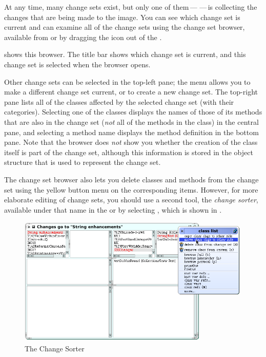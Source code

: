\documentclass[a4paper,10pt,twoside]{book}
\begin{document}
At any time, many change sets exist, but only one of them\,---\,\,---\,is collecting the changes that are being made to the image.  
You can see which change set is current and can examine all of the change sets using the  change set browser, available from  or by dragging the  icon out of the \toolsflapind.

 shows this browser.  The title bar shows which change set is current, and this change set is selected when the  browser opens. 

Other change sets can be selected in the top-left pane; the  menu allows you to make a different change set current, or to create a new change set.
The top-right pane lists all of the classes affected by the selected change set (with their categories).
Selecting one of the classes displays the names of those of its methods that are also in the change set (\emph{not} all of the methods in the class) in the central pane, and selecting a method name displays the method definition in the bottom pane.
Note that the browser does \emph{not} show you whether the creation of the class itself is part of the change set, although this information is stored in the object structure that is used to represent the change set.

The change set browser also lets you delete classes and methods from the change set using the yellow button menu on the corresponding items.  However, for more elaborate editing of change sets, you should use a second tool, the \textit{change sorter}, available under that name in the \toolsflap or by selecting , which is shown in .

\begin{figure}[btp]
	\begin{center}
		\includegraphics[width=\linewidth]{changeSorter}
	\end{center}
	\caption{The Change Sorter}
	\label{fig:changeSorter}
\end{figure}
\end{document}
